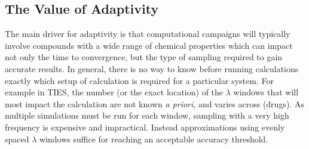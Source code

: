 














\subsection{The Value of Adaptivity}\label{ssec:adapt_ties}


  

The main driver for adaptivity is that computational campaigns will
typically involve compounds with a wide range of chemical properties which can
impact not only the time to convergence, but the type of sampling required to
gain accurate results. In general, there is no way to know before running
calculations exactly which setup of calculation is required for a particular
system. For example in TIES, the number (or the exact location) of the
$\lambda$ windows that will most impact the calculation are not known
\textit{a priori}, and varies across (drugs). As multiple simulations must be 
run for each window, sampling with a very high frequency is expensive and 
impractical. Instead approximations using evenly spaced $\lambda$ windows
suffice for reaching an acceptable accuracy threshold. 

